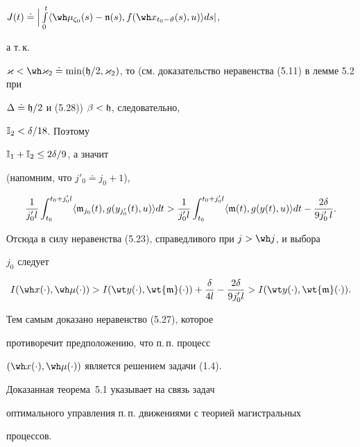$J(t)\doteq\Big|\int\limits_0^t\langle\wh\mu_{\zeta_0}(s)-\frak n(s),


f(\wh x_{t_0-\vartheta }(s),u)\rangle ds|$,


а т.\,к.


$\varkappa<\wh\varkappa_2\doteq\min(\frak h/2,


\varkappa_2)$, то (см. доказательство неравенства (5.11) в лемме 5.2 при


$\Delta\doteq\frak h/2$ и (5.28)) $\beta<\frak h$, следовательно,


$\Bbb I_2<\delta/18$. Поэтому


$\Bbb I_1+\Bbb I_2\le2\delta/9$, а значит


(напомним, что $j'_0\doteq j_0+1$),


$$


\frac{1}{j'_0l}\int_{t_0}^{t_0+j'_0l}\langle\frak m_{j_0}(t),


g(y_{j'_0}(t),u)\rangle dt


>\frac{1}{j'_0l}\int_{t_0}^{t_0+j'_0l}


\langle\frak m(t),g(y(t),u)\rangle dt-


\frac{2\delta}{9 j'_0\,l}.


$$


Отсюда в силу неравенства (5.23), справедливого при $j>\wh j$, и выбора


$j_0$ следует


$$


I(\wh x(\cdot),\wh\mu(\cdot))>


I(\wt y(\cdot),\wt{\frak m}(\cdot))+


\frac{\delta}{4l}-\frac{2\delta}{9 j'_0l}>


I(\wt y(\cdot),\wt{\frak m}(\cdot)).


$$





Тем самым доказано неравенство (5.27), которое 


противоречит предположению, что п.\,п. процесс


$(\wh x(\cdot),\wh\mu(\cdot))$ является решением задачи (1.4).





Доказанная теорема~5.1 указывает на связь задач


оптимального управления п.\,п. движениями с теорией магистральных


процессов.





